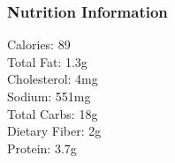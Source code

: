 \subsubsection{Nutrition Information}
Calories: 89 \\
\noindent Total Fat: 1.3g \\
\noindent Cholesterol: 4mg \\
\noindent Sodium: 551mg \\
\noindent Total Carbs: 18g \\
\noindent Dietary Fiber: 2g \\
\noindent Protein: 3.7g
